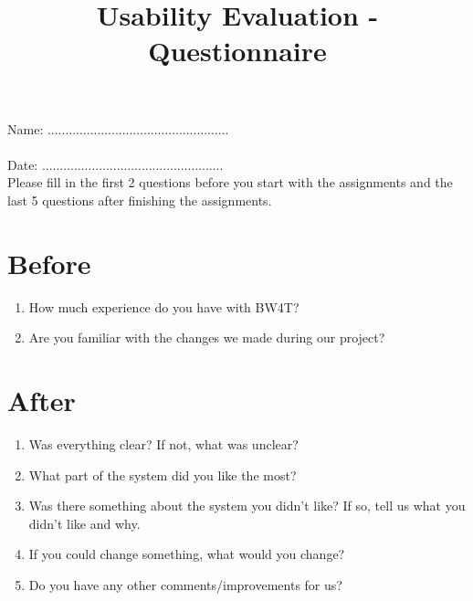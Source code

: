 \documentclass[a4paper]{article}
\title{Usability Evaluation - Questionnaire}
\author{}
\date{}
\begin{document}
\maketitle
Name: ................................................... \\\\
Date: ................................................... \\

Please fill in the first 2 questions before you start with the assignments and the last 5 questions after finishing the assignments.

\section*{Before}
\begin{enumerate}
\itemsep5em
\item How much experience do you have with BW4T?
\item Are you familiar with the changes we made during our project?
\end{enumerate}
\vspace{5em}
\section*{After}
\begin{enumerate}
\itemsep5em
\item Was everything clear? If not, what was unclear?
\item What part of the system did you like the most?
\item Was there something about the system you didn’t like? If so, tell us what you didn’t like and why.
\item If you could change something, what would you change?
\item Do you have any other comments/improvements for us?
\end{enumerate}
\end{document}
